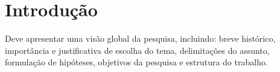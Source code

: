 
\graphicspath{%
  {./Chapter-1/}%
}

\chapter{Introdução}%
\label{chpt:intro}

Deve apresentar uma visão global da pesquisa, incluindo: breve histórico, importância e justificativa de escolha do tema, delimitações do assunto, formulação de hipóteses, objetivos da pesquisa e estrutura do trabalho.


